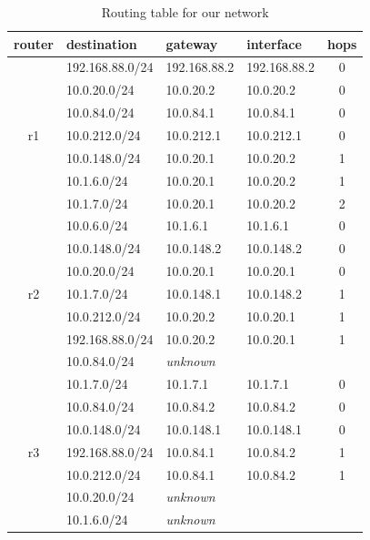 \documentclass[parskip=full]{scrartcl}
\begin{document}
\begin{table}[hb]
    \centering
    \caption{Routing table for our network}
    \label{tab:routing}
    \begin{tabular}{clllc}
        \toprule
        \textbf{router} & \textbf{destination} & \textbf{gateway} & \textbf{interface} & \textbf{hops} \\ \midrule
           & 192.168.88.0/24 & 192.168.88.2 & 192.168.88.2 & 0 \\
           & 10.0.20.0/24    & 10.0.20.2    & 10.0.20.2    & 0 \\
           & 10.0.84.0/24    & 10.0.84.1    & 10.0.84.1    & 0 \\
        r1 & 10.0.212.0/24   & 10.0.212.1   & 10.0.212.1   & 0 \\
           & 10.0.148.0/24   & 10.0.20.1    & 10.0.20.2    & 1 \\
           & 10.1.6.0/24     & 10.0.20.1    & 10.0.20.2    & 1 \\
           & 10.1.7.0/24     & 10.0.20.1    & 10.0.20.2    & 2 \\
        \midrule
           & 10.0.6.0/24     & 10.1.6.1     & 10.1.6.1     & 0 \\
           & 10.0.148.0/24   & 10.0.148.2   & 10.0.148.2   & 0 \\
           & 10.0.20.0/24    & 10.0.20.1    & 10.0.20.1    & 0 \\
        r2 & 10.1.7.0/24     & 10.0.148.1   & 10.0.148.2   & 1 \\
           & 10.0.212.0/24   & 10.0.20.2    & 10.0.20.1    & 1 \\
           & 192.168.88.0/24 & 10.0.20.2    & 10.0.20.1    & 1 \\
           & 10.0.84.0/24    & \textit{unknown} \\
        \midrule
           & 10.1.7.0/24     & 10.1.7.1     & 10.1.7.1     & 0 \\
           & 10.0.84.0/24    & 10.0.84.2    & 10.0.84.2    & 0 \\
           & 10.0.148.0/24   & 10.0.148.1   & 10.0.148.1   & 0 \\
        r3 & 192.168.88.0/24 & 10.0.84.1    & 10.0.84.2    & 1 \\
           & 10.0.212.0/24   & 10.0.84.1    & 10.0.84.2    & 1 \\
           & 10.0.20.0/24    & \textit{unknown} \\
           & 10.1.6.0/24     & \textit{unknown} \\
        \bottomrule
    \end{tabular}
\end{table}
\end{document}
